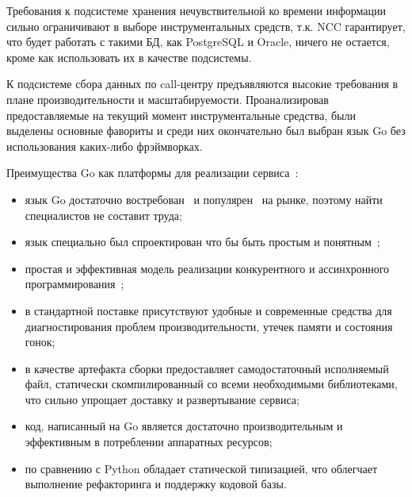 Требования к подсистеме хранения нечувствительной ко времени информации сильно ограничивают
в выборе инструментальных средств, т.к. NCC гарантирует, %
что будет работать с такими БД, как PostgreSQL и Oracle,
ничего не остается, кроме как использовать их в качестве подсистемы.

К подсистеме сбора данных по call-центру предъявляются
высокие требования в плане производительности и масштабируемости.
Проанализировав предоставляемые на текущий момент инструментальные средства,
были выделены основные фавориты и среди них окончательно был выбран язык Go без использования
каких-либо фрэймворках.

Преимущества Go как платформы для реализации сервиса~\cite{}: %
\begin{itemize}
    \item язык Go достаточно востребован~\cite{} %
    и популярен~\cite{} %
    на рынке, поэтому найти специалистов не составит труда;
    \item язык специально был спроектирован что бы быть простым и понятным~\cite{}; %
    \item простая и эффективная модель реализации конкурентного и ассинхронного программирования~\cite{}; %
    \item в стандартной поставке присутствуют удобные и современные средства для диагностирования проблем производительности, %
    утечек памяти %
    и состояния гонок; %
    \item в качестве артефакта сборки предоставляет самодостаточный исполняемый файл,
    статически скомпилированный со всеми необходимыми библиотеками,
    что сильно упрощает доставку и развертывание сервиса;
    \item код, написанный на Go является достаточно производительным и эффективным в потреблении аппаратных ресурсов; %
    \item по сравнению с Python обладает статической типизацией, что облегчает выполнение рефакторинга и поддержку кодовой базы.
\end{itemize}

